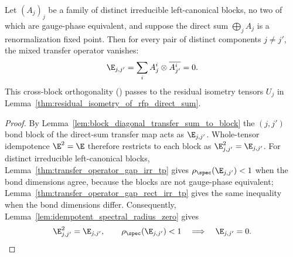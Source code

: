 \begin{lemma}%
    \label{thm:bnt_locally_orthogonal_of_rfp_direct_sum}
    \leanok
    Let $(A_j)_j$ be a family of distinct irreducible left-canonical blocks, no
    two of which are gauge-phase equivalent, and suppose the direct sum
    $\bigoplus_j A_j$ is a renormalization fixed point. Then for every pair of
    distinct components $j\ne j'$, the mixed transfer operator vanishes:
    \begin{align}
        \E_{j,j'}=\sum_i A_j^i\otimes\overline{A_{j'}^i}=0.
        \notag
    \end{align}
    This cross-block orthogonality
    (\cite[Theorem~3.11 and Corollary~3.12]{Cirac2016MPDO_arXiv}) passes to
    the residual isometry tensors $U_j$ in
    Lemma~\ref{thm:residual_isometry_of_rfp_direct_sum}.
\end{lemma}
\begin{proof}\leanok
    By Lemma~\ref{lem:block_diagonal_transfer_sum_to_block} the $(j,j')$ bond
    block of the direct-sum transfer map acts as $\E_{j,j'}$. Whole-tensor
    idempotence $\E^2=\E$ therefore restricts to each block as
    $\E_{j,j'}^2=\E_{j,j'}$. For distinct irreducible left-canonical blocks,
    Lemma~\ref{thm:transfer_operator_gap_irr_tp} gives
    $\rho_{\spec}(\E_{j,j'})<1$ when the bond dimensions agree, because the
    blocks are not gauge-phase equivalent;
    Lemma~\ref{thm:transfer_operator_gap_rect_irr_tp} gives the same
    inequality when the bond dimensions differ. Consequently,
    Lemma~\ref{lem:idempotent_spectral_radius_zero} gives
    \begin{align}
        \E_{j,j'}^2=\E_{j,j'},\qquad
        \rho_{\spec}(\E_{j,j'})<1
        \quad\Longrightarrow\quad
        \E_{j,j'}=0.
        \notag
    \end{align}
\end{proof}

